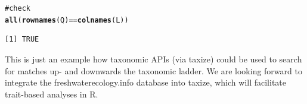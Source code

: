 \documentclass[letterpaper,superscriptaddress,showkeys,longbibliography,10pt]{revtex4-1}\usepackage{graphicx, color}
\makeatletter
\newcommand{\hlfunctioncall}[1]{\textcolor[rgb]{0.501960784313725,0,0.329411764705882}{\textbf{#1}}}%
\newcommand{\hlcomment}[1]{\textcolor[rgb]{0.180392156862745,0.6,0.341176470588235}{#1}}%
\newenvironment{kframe}{%
 \def\at@end@of@kframe{}%
 \ifinner\ifhmode%
  \def\at@end@of@kframe{\end{minipage}}%
  \begin{minipage}{\columnwidth}%
 \fi\fi%
 \def\FrameCommand##1{\hskip\@totalleftmargin \hskip-\fboxsep
 \colorbox{shadecolor}{##1}\hskip-\fboxsep
     \hskip-\linewidth \hskip-\@totalleftmargin \hskip\columnwidth}%
 \MakeFramed {\advance\hsize-\width
   \@totalleftmargin\z@ \linewidth\hsize
   \@setminipage}}%
 {\par\unskip\endMakeFramed%
 \at@end@of@kframe}
\newenvironment{knitrout}{}{} %
\makeatother
\begin{document}
\begin{appendices}
\begin{knitrout}
\begin{kframe}
\begin{alltt}
\hlcomment{# check}
\hlfunctioncall{all}(\hlfunctioncall{rownames}(Q) == \hlfunctioncall{colnames}(L))
\end{alltt}
\begin{verbatim}
[1] TRUE
\end{verbatim}
\end{kframe}
\end{knitrout}


This is just an example how taxonomic APIs (via taxize) could be used to search for matches up- and downwards the taxonomic ladder. We are looking forward to integrate the freshwaterecology.info database \citep{freshwaterecology} into taxize, which will facilitate trait-based analyses in R.

\end{appendices}



\end{document}
